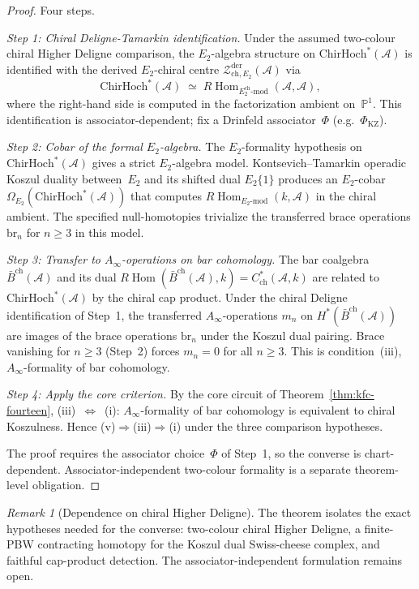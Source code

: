 \documentclass[11pt,reqno]{amsart}
\theoremstyle{definition}
\theoremstyle{remark}
\newtheorem{remark}[theorem]{Remark}
\newcommand{\cA}{\mathcal{A}}
\newcommand{\cZ}{\mathcal{Z}}
\newcommand{\barBch}{\bar{B}^{\mathrm{ch}}}
\newcommand{\RHom}{R\!\operatorname{Hom}}
\newcommand{\ChirHoch}{\mathrm{ChirHoch}}
\newcommand{\bP}{\mathbb{P}}
\newcommand{\Etwo}{E_2}
\newcommand{\Ainfty}{A_\infty}
\numberwithin{equation}{section}
\begin{document}
\begin{proof}
Four steps.

\emph{Step 1: Chiral Deligne-Tamarkin identification.} Under
the assumed two-colour chiral Higher Deligne comparison, the
$\Etwo$-algebra structure on $\ChirHoch^*(\cA)$ is
identified with the derived $\Etwo$-chiral centre
$\cZ^{\mathrm{der}}_{\mathrm{ch},\Etwo}(\cA)$ via
\[
\ChirHoch^*(\cA) \;\simeq\;
\RHom_{\Etwo^{\mathrm{ch}}\text{-}\mathrm{mod}}(\cA, \cA),
\]
where the right-hand side is computed in the factorization
ambient on~$\bP^1$. This identification is associator-dependent;
fix a Drinfeld associator~$\Phi$ (e.g.\ $\Phi_{\mathrm{KZ}}$).

\emph{Step 2: Cobar of the formal $\Etwo$-algebra.} The
$\Etwo$-formality hypothesis on $\ChirHoch^*(\cA)$ gives a
strict $\Etwo$-algebra model. Kontsevich--Tamarkin operadic
Koszul duality between~$\Etwo$ and its shifted dual
$\Etwo\{1\}$ produces an $\Etwo$-cobar
$\Omega_{\Etwo}(\ChirHoch^*(\cA))$ that computes
$\RHom_{\Etwo\text{-}\mathrm{mod}}(k, \cA)$ in the chiral
ambient. The specified null-homotopies trivialize the transferred
brace operations $\mathrm{br}_n$ for $n\geq3$ in this model.

\emph{Step 3: Transfer to $\Ainfty$-operations on bar
cohomology.} The bar coalgebra $\barBch(\cA)$ and its dual
$\RHom(\barBch(\cA), k) = C^*_{\mathrm{ch}}(\cA, k)$ are
related to $\ChirHoch^*(\cA)$ by the chiral cap product. Under
the chiral Deligne identification of Step~1, the transferred
$\Ainfty$-operations $m_n$ on $H^*(\barBch(\cA))$ are images of
the brace operations $\mathrm{br}_n$ under the Koszul dual
pairing. Brace vanishing for $n \geq 3$ (Step~2) forces
$m_n = 0$ for all $n \geq 3$. This is condition~(iii),
$\Ainfty$-formality of bar cohomology.

\emph{Step 4: Apply the core criterion.} By the core circuit of
Theorem~\ref{thm:kfc-fourteen}, (iii)~$\Leftrightarrow$~(i):
$\Ainfty$-formality of bar cohomology is equivalent to chiral
Koszulness. Hence (v)$\Rightarrow$(iii)$\Rightarrow$(i) under the
three comparison hypotheses.

The proof requires the associator choice~$\Phi$ of Step~1, so
the converse is chart-dependent. Associator-independent
two-colour formality is a separate theorem-level obligation.
\end{proof}

\begin{remark}[Dependence on chiral Higher Deligne]
\label{rem:kfc-v-converse-dependence}
The theorem isolates the exact hypotheses needed for the converse:
two-colour chiral Higher Deligne, a finite-PBW contracting homotopy
for the Koszul dual Swiss-cheese complex, and faithful cap-product
detection. The associator-independent formulation remains open.
\end{remark}
\end{document}
